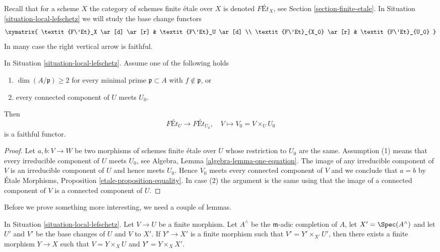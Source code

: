 \noindent
Recall that for a scheme $X$ the category of schemes finite
\'etale over $X$ is denoted $\textit{F\'Et}_X$, see
Section \ref{section-finite-etale}.
In Situation \ref{situation-local-lefschetz}
we will study the base change functors
$$
\xymatrix{
\textit{F\'Et}_X \ar[d] \ar[r] & \textit{F\'Et}_U \ar[d] \\
\textit{F\'Et}_{X_0} \ar[r] & \textit{F\'Et}_{U_0}
}
$$
In many case the right vertical arrow is faithful.

\begin{lemma}
\label{lemma-faithful}
In Situation \ref{situation-local-lefschetz}.
Assume one of the following holds
\begin{enumerate}
\item $\dim(A/\mathfrak p) \geq 2$ for every minimal prime
$\mathfrak p \subset A$ with $f \not \in \mathfrak p$, or
\item every connected component of $U$ meets $U_0$.
\end{enumerate}
Then
$$
\textit{F\'Et}_U \longrightarrow \textit{F\'Et}_{U_0},\quad
V \longmapsto V_0 = V \times_U U_0
$$
is a faithful functor.
\end{lemma}

\begin{proof}
Let $a, b : V \to W$ be two morphisms of schemes finite \'etale over $U$
whose restriction to $U_0$ are the same. Assumption (1)
means that every irreducible component of $U$ meets $U_0$, see
Algebra, Lemma \ref{algebra-lemma-one-equation}.
The image of any irreducible component of $V$ is an
irreducible component of $U$ and hence meets $U_0$.
Hence $V_0$ meets every connected component of $V$ and
we conclude that $a = b$ by \'Etale Morphisms, Proposition
\ref{etale-proposition-equality}.
In case (2) the argument is the same using that the image
of a connected component of $V$ is a connected component of $U$.
\end{proof}

\noindent
Before we prove something more interesting, we need a couple of lemmas.

\begin{lemma}
\label{lemma-fill-in-missing}
In Situation \ref{situation-local-lefschetz}. Let $V \to U$ be a finite
morphism.  Let $A^\wedge$ be the $\mathfrak m$-adic completion of $A$,
let $X' = \Spec(A^\wedge)$ and let $U'$ and $V'$ be the base changes of
$U$ and $V$ to $X'$. If $Y' \to X'$ is a finite morphism such that
$V' = Y' \times_{X'} U'$, then there exists a finite morphism $Y \to X$
such that $V = Y \times_X U$ and $Y' = Y \times_X X'$.
\end{lemma}

